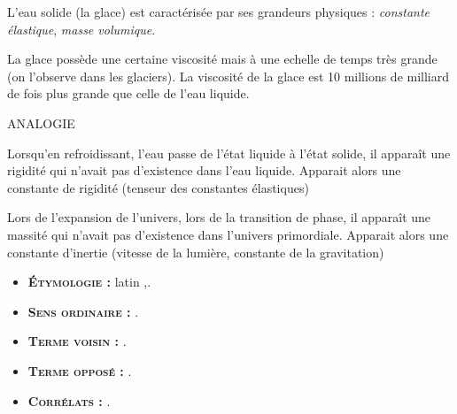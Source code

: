 L'eau solide (la glace) est caractérisée par ses grandeurs physiques : {\it constante élastique}, {\it masse volumique}.

La glace possède une certaine viscosité mais à une echelle de temps très grande (on l'observe dans les glaciers). La viscosité de la glace est 10 millions de milliard de fois plus grande que celle de l'eau liquide. 


ANALOGIE

Lorsqu'en refroidissant, l'eau passe de l'état liquide à l'état solide, il apparaît une rigidité qui n'avait pas d'existence dans l'eau liquide. Apparait alors une constante de rigidité (tenseur des constantes élastiques)

Lors de l'expansion de l'univers, lors de la transition de phase, il apparaît une massité qui n'avait pas d'existence dans l'univers primordiale. Apparait alors une constante d'inertie (vitesse de la lumière, constante de la gravitation)

{\footnotesize
\begin{itemize}[leftmargin=1cm, label=, itemsep=1pt]
\item {\bf \textsc{Étymologie} :} latin {\it },.
\item {\bf \textsc{Sens ordinaire} :} .
\item {\bf \textsc{Terme voisin} :} .
\item {\bf \textsc{Terme opposé} :} .
\item {\bf \textsc{Corrélats} :} .
\end{itemize}
}
